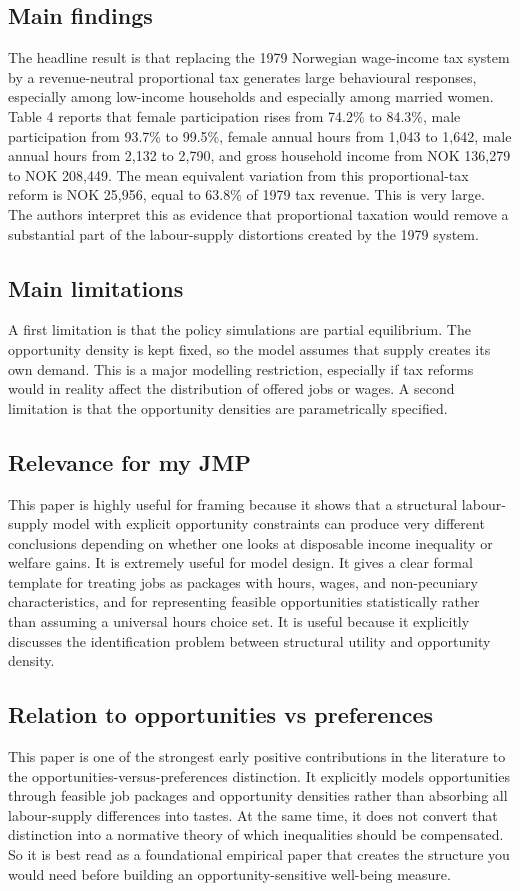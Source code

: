 \documentclass[11pt,a4paper]{article}
\begin{document}
\subsection*{Main findings}
The headline result is that replacing the 1979 Norwegian wage-income tax system by a revenue-neutral proportional tax generates large behavioural responses, especially among low-income households and especially among married women. Table 4 reports that female participation rises from 74.2\% to 84.3\%, male participation from 93.7\% to 99.5\%, female annual hours from 1,043 to 1,642, male annual hours from 2,132 to 2,790, and gross household income from NOK 136,279 to NOK 208,449. The mean equivalent variation from this proportional-tax reform is NOK 25,956, equal to 63.8\% of 1979 tax revenue. This is very large. The authors interpret this as evidence that proportional taxation would remove a substantial part of the labour-supply distortions created by the 1979 system.

\subsection*{Main limitations}
A first limitation is that the policy simulations are partial equilibrium. The opportunity density is kept fixed, so the model assumes that supply creates its own demand. This is a major modelling restriction, especially if tax reforms would in reality affect the distribution of offered jobs or wages. A second limitation is that the opportunity densities are parametrically specified.

\subsection*{Relevance for my JMP}
This paper is highly useful for framing because it shows that a structural labour-supply model with explicit opportunity constraints can produce very different conclusions depending on whether one looks at disposable income inequality or welfare gains. It is extremely useful for model design. It gives a clear formal template for treating jobs as packages with hours, wages, and non-pecuniary characteristics, and for representing feasible opportunities statistically rather than assuming a universal hours choice set. It is useful because it explicitly discusses the identification problem between structural utility and opportunity density.

\subsection*{Relation to opportunities vs preferences}
This paper is one of the strongest early positive contributions in the literature to the opportunities-versus-preferences distinction. It explicitly models opportunities through feasible job packages and opportunity densities rather than absorbing all labour-supply differences into tastes. At the same time, it does not convert that distinction into a normative theory of which inequalities should be compensated. So it is best read as a foundational empirical paper that creates the structure you would need before building an opportunity-sensitive well-being measure.
\end{document}
